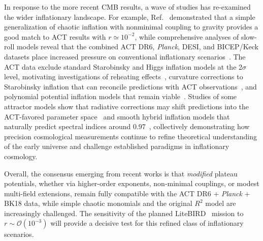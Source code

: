 \documentclass[aps,prev,twocolumn,preprintnumbers,floatfix,nofootinbib]{revtex4-1}
\begin{document}
In response to the more recent CMB results, 
a wave of studies has re-examined the wider inflationary landscape. 
For example, Ref.~\cite{Kallosh:2025rni} demonstrated that a simple generalization of chaotic inflation with nonminimal coupling to gravity provides a good match to ACT results with $r \simeq 10^{-2}$, while comprehensive analyses of slow-roll models reveal that the combined ACT DR6, \textit{Planck}, DESI, and BICEP/Keck datasets place increased pressure on conventional inflationary scenarios~\cite{Aoki:2025wld, Berera:2025vsu, Brahma:2025dio, Gialamas:2025kef, accid, Salvio:2025izr, Dioguardi:2025mpp, Gao:2025onc, He:2025bli, Drees:2025ngb, Maity:2025czp, Yin:2025rrs, Byrnes:2025kit, Biswas:2025adi, Haque:2025uga, Frolovsky:2025iao, Heidarian:2025drk, Choudhury:2025vso, Dioguardi:2025vci}. The ACT data exclude standard Starobinsky and Higgs inflation models at the 2$\sigma$ level, motivating investigations of reheating effects~\cite{Haque:2025uri, Zharov:2025evb, Liu:2025qca, Mondal:2025kur, German:2025ide}, curvature corrections to Starobinsky inflation that can reconcile predictions with ACT observations~\cite{Kim:2025dyi,Gialamas:2025ofz, Haque:2025uis, Yogesh:2025wak, Addazi:2025qra, Ahmed:2025rrg, Modak:2025bjv,Cheong:2025vmz}, and polynomial potential inflation models that remain viable~\cite{Yi:2025dms, Kallosh:2025ijd, Peng:2025bws}. Studies of some attractor models show that radiative corrections may shift predictions into the ACT-favored parameter space~\cite{Pallis:2025nrv, Chakraborty:2025oyj, Odintsov:2025wai, Wolf:2025ecy, Han:2025cwk, Pallis:2025gii} and smooth hybrid inflation models that naturally predict spectral indices around 0.97~\cite{Okada:2025lpl}, collectively demonstrating how precision cosmological measurements continue to refine theoretical understanding of the early universe and challenge established paradigms in inflationary cosmology. 

Overall, the consensus emerging from recent works is that \emph{modified} plateau potentials, whether via higher-order exponents, non-minimal couplings, or modest multi-field extensions, remain fully compatible with the ACT DR6 + \textit{Planck} + BK18 data, while simple chaotic monomials and the original $R^2$ model are increasingly challenged. The sensitivity of the planned LiteBIRD~\cite{Hazumi:2019lys} mission to $r \sim \mathcal{O}(10^{-3})$ will provide a decisive test for this refined class of inflationary scenarios.
\end{document}
